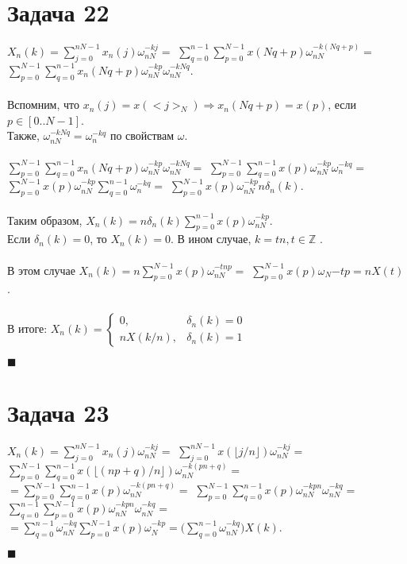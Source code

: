 \documentclass{article}
\title{}
\author{
	Дерюгин Денис, студент 561-й учебной группы
}
\date{\today}
\newcommand\proofend{\begin{flushright}$\blacksquare$\end{flushright}}
\begin{document}
\maketitle
\setcounter{MaxMatrixCols}{20}
\large {
\section*{Задача 22}
$X_n(k) = \sum\limits_{j=0}^{nN - 1} x_n(j) \omega_{nN}^{-kj} =$
$\sum\limits_{q=0}^{n-1}\sum\limits_{p=0}^{N-1} x(Nq + p)\omega_{nN}^{-k(Nq+p)} =$
$\sum\limits_{p=0}^{N-1}\sum\limits_{q=0}^{n-1} x_n(Nq + p) \omega_{nN}^{-kp} \omega_{nN}^{-kNq}$.\\ \\
Вспомним, что $x_n(j) = x(<j>_N) \Rightarrow x_n(Nq + p) = x(p)$, если $p \in [0..N-1]$.\\
Также, $\omega_{nN}^{-kNq} = \omega_n^{-kq}$ по свойствам $\omega$.\\ \\
$\sum\limits_{p=0}^{N-1}\sum\limits_{q=0}^{n-1} x_n(Nq + p) \omega_{nN}^{-kp} \omega_{nN}^{-kNq} =$
$\sum\limits_{p=0}^{N-1}\sum\limits_{q=0}^{n-1}x(p)\omega_{nN}^{-kp} \omega_n^{-kq} =$
$\sum\limits_{p=0}^{N-1}x(p)\omega_{nN}^{-kp} \sum\limits_{q=0}^{n-1}\omega_n^{-kq} = $
$\sum\limits_{p=0}^{N-1}x(p)\omega_{nN}^{-kp} n\delta_n(k).$\\ \\
Таким образом, $X_n(k) = n\delta_n(k) \sum\limits_{p=0}^{n-1}x(p)\omega_{nN}^{-kp}$.\\
Если $\delta_n(k) = 0$, то $X_n(k) = 0$. В ином случае, $k = tn, t \in \mathbb{Z}$
.\\ \\
В этом случае $X_n(k) = n \sum\limits_{p=0}^{N-1}x(p)\omega_{nN}^{-tnp} = $
$\sum\limits_{p = 0}^{N-1} x(p)\omega_{N}{-tp} = n X(t)$.\\ \\
В итоге: $X_n(k) = \left\{\begin{matrix}
0, & \delta_n(k) = 0 \\
nX(k/n),  & \delta_n(k) = 1
  \end{matrix}\right.$
\proofend

\section*{Задача 23}
$X_n(k) = \sum\limits_{j=0}^{nN - 1} x_n(j) \omega_{nN}^{-kj} = $
$\sum\limits_{j=0}^{nN-1}x(\lfloor j / n \rfloor) \omega_{nN}^{-kj} =$
$\sum\limits_{p=0}^{N-1}\sum\limits_{q=0}^{n-1} x(\lfloor (np + q) / n \rfloor) \omega_{nN}^{-k(pn + q)} =$ \\
$ = \sum\limits_{p=0}^{N-1}\sum\limits_{q=0}^{n-1}x(p)\omega_{nN}^{-k(pn + q)} =$
$\sum\limits_{p=0}^{N-1} \sum\limits_{q=0}^{n-1}x(p)\omega_{nN}^{-kpn} \omega_{nN}^{-kq} =$
$\sum\limits_{q=0}^{n-1} \sum\limits_{p=0}^{N-1} x(p) \omega_{nN}^{-kpn}\omega_{nN}^{-kq} =$\\
$= \sum\limits_{q=0}^{n-1} \omega_{nN}^{-kq} \sum\limits_{p=0}^{N-1}x(p) \omega_N^{-kp} = \Bigg ( \sum\limits_{q=0}^{n-1}\omega_{nN}^{-kq} \Bigg ) X(k)$.
\proofend
\pagebreak

}
\end{document}
